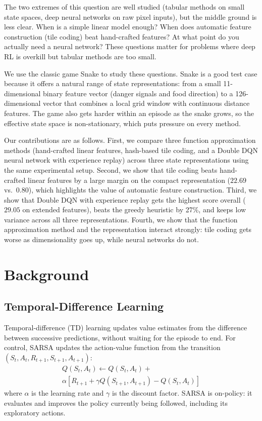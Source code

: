 \documentclass[letterpaper]{article}
\begin{document}
The two extremes of this question are well studied (tabular methods on small state spaces, deep neural networks on raw pixel inputs), but the middle ground is less clear. When is a simple linear model enough? When does automatic feature construction (tile coding) beat hand-crafted features? At what point do you actually need a neural network? These questions matter for problems where deep RL is overkill but tabular methods are too small.

We use the classic game Snake to study these questions. Snake is a good test case because it offers a natural range of state representations: from a small 11-dimensional binary feature vector (danger signals and food direction) to a 126-dimensional vector that combines a local grid window with continuous distance features. The game also gets harder within an episode as the snake grows, so the effective state space is non-stationary, which puts pressure on every method.

Our contributions are as follows. First, we compare three function approximation methods (hand-crafted linear features, hash-based tile coding, and a Double DQN neural network with experience replay) across three state representations using the same experimental setup. Second, we show that tile coding beats hand-crafted linear features by a large margin on the compact representation ($22.69$ vs.\ $0.80$), which highlights the value of automatic feature construction. Third, we show that Double DQN with experience replay gets the highest score overall ($29.05$ on extended features), beats the greedy heuristic by 27\%, and keeps low variance across all three representations. Fourth, we show that the function approximation method and the representation interact strongly: tile coding gets worse as dimensionality goes up, while neural networks do not.

\section{Background}

\subsection{Temporal-Difference Learning}

Temporal-difference (TD) learning \cite{sutton1988td} updates value estimates from the difference between successive predictions, without waiting for the episode to end. For control, SARSA \cite{rummery1994sarsa} updates the action-value function from the transition $(S_t, A_t, R_{t+1}, S_{t+1}, A_{t+1})$:
\begin{multline}
    Q(S_t, A_t) \leftarrow Q(S_t, A_t) + \\
    \alpha \left[ R_{t+1} + \gamma Q(S_{t+1}, A_{t+1}) - Q(S_t, A_t) \right]
\end{multline}
where $\alpha$ is the learning rate and $\gamma$ is the discount factor. SARSA is on-policy: it evaluates and improves the policy currently being followed, including its exploratory actions.
\end{document}
